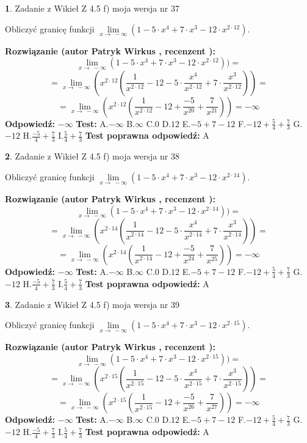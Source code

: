 \documentclass[12pt, a4paper]{article}
\theoremstyle{definition} %
\newtheorem{zad}{}
\newcommand{\zadStart}[1]{\begin{zad}#1\newline}
\newcommand{\zadStop}{\end{zad}}
\newcommand{\rozwStart}[2]{\noindent \textbf{Rozwiązanie (autor #1 , recenzent #2): }\newline}
\newcommand{\rozwStop}{\newline}
\newcommand{\odpStart}{\noindent \textbf{Odpowiedź:}\newline}
\newcommand{\odpStop}{\newline}
\newcommand{\testStart}{\noindent \textbf{Test:}\newline}
\newcommand{\testStop}{\newline}
\newcommand{\kluczStart}{\noindent \textbf{Test poprawna odpowiedź:}\newline}
\newcommand{\kluczStop}{\newline}
\begin{document}
\zadStart{Zadanie z Wikieł Z 4.5 f) moja wersja nr 37}



Obliczyć granicę funkcji  $\lim\limits_{x\to\ -\infty}(1 - 5 \cdot x^{4}+7 \cdot x^{3}- 12 \cdot x^{2\cdot12})$.
\zadStop
\rozwStart{Patryk Wirkus}{}
$$\lim\limits_{x\to\ -\infty}(1 - 5 \cdot x^{4}+7 \cdot x^{3}- 12 \cdot x^{2\cdot12}))=$$
$$=\lim\limits_{x\to\ -\infty}(x^{2\cdot12}(\frac{1}{x^{2\cdot12}}-12 -5 \cdot \frac{x^{4}}{x^{2\cdot12}}+7 \cdot \frac{x^{3}}{x^{2\cdot12}}))=$$
$$=\lim\limits_{x\to\ -\infty}(x^{2\cdot12}(\frac{1}{x^{2\cdot12}}-12 + \frac{-5}{x^{20}}+ \frac{7}{x^{21}}))=-\infty$$
\rozwStop
\odpStart
$-\infty$
\odpStop
\testStart
A.$-\infty$ B.$\infty$ C.$0$ D.$12$ E.$-5 + 7 - 12$
F.$-12+\frac{5}{4}+\frac{7}{3}$ G.$-12$
H.$\frac{-5}{4}+\frac{7}{3}$
I.$\frac{5}{4}+\frac{7}{3}$
\testStop
\kluczStart
A
\kluczStop



\zadStart{Zadanie z Wikieł Z 4.5 f) moja wersja nr 38}



Obliczyć granicę funkcji  $\lim\limits_{x\to\ -\infty}(1 - 5 \cdot x^{4}+7 \cdot x^{3}- 12 \cdot x^{2\cdot14})$.
\zadStop
\rozwStart{Patryk Wirkus}{}
$$\lim\limits_{x\to\ -\infty}(1 - 5 \cdot x^{4}+7 \cdot x^{3}- 12 \cdot x^{2\cdot14}))=$$
$$=\lim\limits_{x\to\ -\infty}(x^{2\cdot14}(\frac{1}{x^{2\cdot14}}-12 -5 \cdot \frac{x^{4}}{x^{2\cdot14}}+7 \cdot \frac{x^{3}}{x^{2\cdot14}}))=$$
$$=\lim\limits_{x\to\ -\infty}(x^{2\cdot14}(\frac{1}{x^{2\cdot14}}-12 + \frac{-5}{x^{24}}+ \frac{7}{x^{25}}))=-\infty$$
\rozwStop
\odpStart
$-\infty$
\odpStop
\testStart
A.$-\infty$ B.$\infty$ C.$0$ D.$12$ E.$-5 + 7 - 12$
F.$-12+\frac{5}{4}+\frac{7}{3}$ G.$-12$
H.$\frac{-5}{4}+\frac{7}{3}$
I.$\frac{5}{4}+\frac{7}{3}$
\testStop
\kluczStart
A
\kluczStop



\zadStart{Zadanie z Wikieł Z 4.5 f) moja wersja nr 39}



Obliczyć granicę funkcji  $\lim\limits_{x\to\ -\infty}(1 - 5 \cdot x^{4}+7 \cdot x^{3}- 12 \cdot x^{2\cdot15})$.
\zadStop
\rozwStart{Patryk Wirkus}{}
$$\lim\limits_{x\to\ -\infty}(1 - 5 \cdot x^{4}+7 \cdot x^{3}- 12 \cdot x^{2\cdot15}))=$$
$$=\lim\limits_{x\to\ -\infty}(x^{2\cdot15}(\frac{1}{x^{2\cdot15}}-12 -5 \cdot \frac{x^{4}}{x^{2\cdot15}}+7 \cdot \frac{x^{3}}{x^{2\cdot15}}))=$$
$$=\lim\limits_{x\to\ -\infty}(x^{2\cdot15}(\frac{1}{x^{2\cdot15}}-12 + \frac{-5}{x^{26}}+ \frac{7}{x^{27}}))=-\infty$$
\rozwStop
\odpStart
$-\infty$
\odpStop
\testStart
A.$-\infty$ B.$\infty$ C.$0$ D.$12$ E.$-5 + 7 - 12$
F.$-12+\frac{5}{4}+\frac{7}{3}$ G.$-12$
H.$\frac{-5}{4}+\frac{7}{3}$
I.$\frac{5}{4}+\frac{7}{3}$
\testStop
\kluczStart
A
\kluczStop
\end{document}
